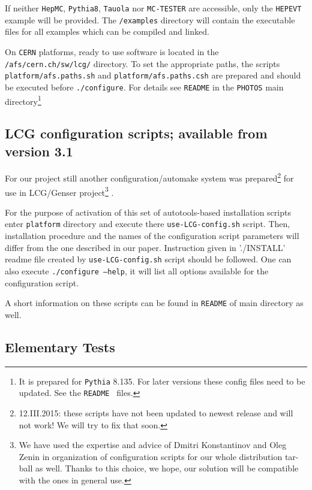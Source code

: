 \documentclass[]{Photos_interface_design}
\begin{document}
If neither {\tt HepMC}, {\tt Pythia8}, {\tt Tauola} nor {\tt MC-TESTER} are accessible, 
only the {\tt HEPEVT} example will be provided. The {\tt /examples} directory will 
contain the executable files for all examples which can be compiled and linked.

On {\tt CERN} platforms, ready to use software is located in the {\tt /afs/cern.ch/sw/lcg/}
directory. To set the appropriate paths, the scripts 
{\tt platform/afs.paths.sh} and {\tt platform/afs.paths.csh} are prepared and should be executed before
{\tt ./configure}. For details see {\tt README} in the {\tt PHOTOS} main directory\footnote { It is prepared for {\tt  Pythia} 8.135. For later  versions
these config files need to be updated. See the {\tt README } files.}

\subsection{ LCG configuration scripts; available from version 3.1%
}
\label{sec:autotools}

For our project still another configuration/automake system was
prepared\footnote{12.III.2015: these scripts have not been updated to newest release and will not work! We will try to fix that soon.} 
for use in LCG/Genser project\footnote{We have used the expertise and advice
of Dmitri Konstantinov and Oleg Zenin in organization of configuration scripts
for our whole distribution tar-ball as well. Thanks to this choice, we hope, our solution
 will be compatible with the ones in general use.} \cite{LCG,Kirsanov:2008zz}.

For the purpose of activation of this set of autotools\cite{autotools}-based installation scripts
enter {\tt platform} directory and execute there {\tt use-LCG-config.sh} script.
Then, installation procedure and the names of the configuration script parameters will differ from the one 
described in our paper. Instruction given in  './INSTALL' readme file created by {\tt use-LCG-config.sh} script
should be followed. One can also execute {\tt ./configure --help}, it will 
list all options available for the configuration script.

A short information on these scripts can be found in {\tt README} of main directory as well.

\subsection{Elementary Tests}
\label{sect:elem}
\end{document}
